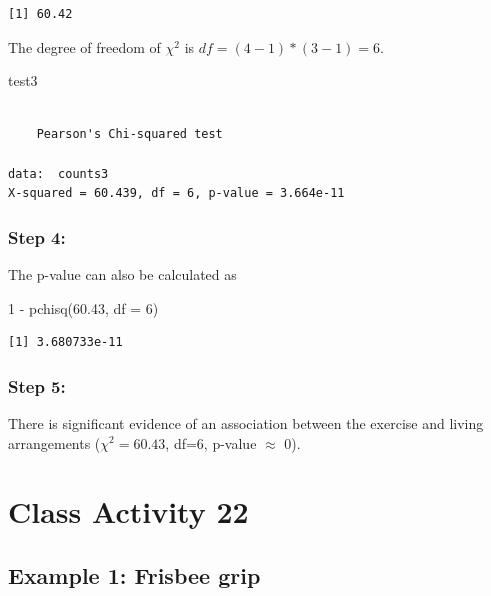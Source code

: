 \documentclass[
]{book}
\newenvironment{Shaded}{\begin{snugshade}}{\end{snugshade}}
\newcommand{\AttributeTok}[1]{\textcolor[rgb]{0.77,0.63,0.00}{#1}}
\newcommand{\DecValTok}[1]{\textcolor[rgb]{0.00,0.00,0.81}{#1}}
\newcommand{\FloatTok}[1]{\textcolor[rgb]{0.00,0.00,0.81}{#1}}
\newcommand{\FunctionTok}[1]{\textcolor[rgb]{0.00,0.00,0.00}{#1}}
\newcommand{\NormalTok}[1]{#1}
\newcommand{\SpecialCharTok}[1]{\textcolor[rgb]{0.00,0.00,0.00}{#1}}
\begin{document}
\begin{verbatim}
[1] 60.42
\end{verbatim}

The degree of freedom of \(\chi^2\) is \(df = (4-1)*(3-1) = 6\).

\begin{Shaded}
\begin{Highlighting}[]
\NormalTok{test3}
\end{Highlighting}
\end{Shaded}

\begin{verbatim}

    Pearson's Chi-squared test

data:  counts3
X-squared = 60.439, df = 6, p-value = 3.664e-11
\end{verbatim}

\hypertarget{step-4}{%
\subsection{Step 4:}\label{step-4}}

The p-value can also be calculated as

\begin{Shaded}
\begin{Highlighting}[]
\DecValTok{1} \SpecialCharTok{{-}} \FunctionTok{pchisq}\NormalTok{(}\FloatTok{60.43}\NormalTok{, }\AttributeTok{df =} \DecValTok{6}\NormalTok{)}
\end{Highlighting}
\end{Shaded}

\begin{verbatim}
[1] 3.680733e-11
\end{verbatim}

\hypertarget{step-5}{%
\subsection{Step 5:}\label{step-5}}

There is significant evidence of an association between the exercise and living arrangements (\(\chi^2 = 60.43\), df=6, p-value \(\approx\) 0).

\hypertarget{class-activity-22}{%
\chapter{Class Activity 22}\label{class-activity-22}}

\hypertarget{example-1-frisbee-grip}{%
\section{Example 1: Frisbee grip}\label{example-1-frisbee-grip}}
\end{document}
